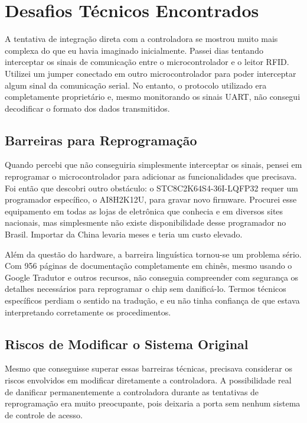 \section{Desafios Técnicos Encontrados}
\label{sec:desafios}

A tentativa de integração direta com a controladora se mostrou muito mais complexa do que eu havia imaginado inicialmente. Passei dias tentando interceptar os sinais de comunicação entre o microcontrolador e o leitor RFID. Utilizei um jumper conectado em outro microcontrolador para poder interceptar algum sinal da comunicação serial. No entanto, o protocolo utilizado era completamente proprietário e, mesmo monitorando os sinais UART, não consegui decodificar o formato dos dados transmitidos.

\subsection{Barreiras para Reprogramação}

Quando percebi que não conseguiria simplesmente interceptar os sinais, pensei em reprogramar o microcontrolador para adicionar as funcionalidades que precisava. Foi então que descobri outro obstáculo: o STC8C2K64S4-36I-LQFP32 requer um programador específico, o AI8H2K12U, para gravar novo firmware. Procurei esse equipamento em todas as lojas de eletrônica que conhecia e em diversos sites nacionais, mas simplesmente não existe disponibilidade desse programador no Brasil. Importar da China levaria meses e teria um custo elevado.

Além da questão do hardware, a barreira linguística tornou-se um problema sério. Com 956 páginas de documentação completamente em chinês, mesmo usando o Google Tradutor e outros recursos, não conseguia compreender com segurança os detalhes necessários para reprogramar o chip sem danificá-lo. Termos técnicos específicos perdiam o sentido na tradução, e eu não tinha confiança de que estava interpretando corretamente os procedimentos.

\subsection{Riscos de Modificar o Sistema Original}

Mesmo que conseguisse superar essas barreiras técnicas, precisava considerar os riscos envolvidos em modificar diretamente a controladora. A possibilidade real de danificar permanentemente a controladora durante as tentativas de reprogramação era muito preocupante, pois deixaria a porta sem nenhum sistema de controle de acesso.

